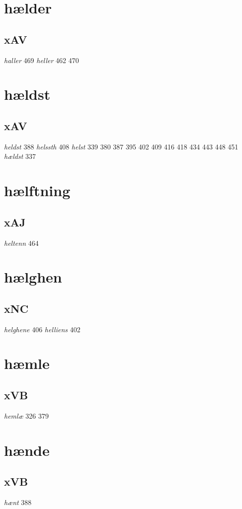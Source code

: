 \documentclass[a4paper,twocolumn]{article}
\begin{document}
\section{hælder}
\label{sec:orgd101764}
\subsection{xAV}
\label{sec:org82af29b}
\emph{haller} 469 \emph{heller} 462 470 
\section{hældst}
\label{sec:org7ae9856}
\subsection{xAV}
\label{sec:orgd0b71a5}
\emph{heldst} 388 \emph{helssth} 408 \emph{helst} 339 380 387 395 402 409 416 418 434 443 448 451 \emph{hældst} 337 
\section{hælftning}
\label{sec:org6b97c02}
\subsection{xAJ}
\label{sec:orgaa8d666}
\emph{heltenn} 464 
\section{hælghen}
\label{sec:org0aa0d3c}
\subsection{xNC}
\label{sec:orgf1a4a22}
\emph{helghene} 406 \emph{helliens} 402 
\section{hæmle}
\label{sec:org071e244}
\subsection{xVB}
\label{sec:org8d93490}
\emph{hemlæ} 326 379 
\section{hænde}
\label{sec:org89f34ba}
\subsection{xVB}
\label{sec:org4ef1d92}
\emph{hænt} 388 
\end{document}
